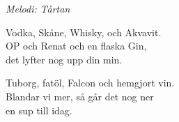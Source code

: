 {\footnotesize\textit{Melodi: Tårtan}}\par
\vspace{10pt}
Vodka, Skåne, Whisky, och Akvavit.\\
OP och Renat och en flaska Gin,\\
det lyfter nog upp din min.\par
\vspace{10pt}
Tuborg, fatöl, Falcon och hemgjort vin.\\
Blandar vi mer, så går det nog ner\\
en sup till idag.
